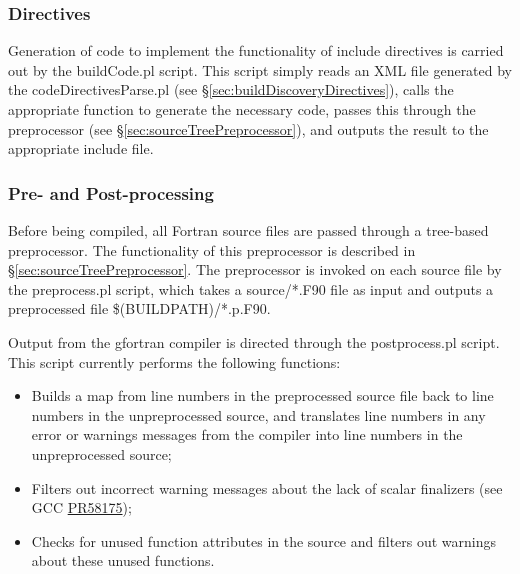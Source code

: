 \subsubsection{Directives}\label{sec:codeBuildIncludeDirectives}

Generation of code to implement the functionality of {\normalfont \ttfamily include} directives is carried out by the {\normalfont \ttfamily buildCode.pl} script. This script simply reads an XML file generated by the {\normalfont \ttfamily codeDirectivesParse.pl} (see \S\ref{sec:buildDiscoveryDirectives}), calls the appropriate function to generate the necessary code, passes this through the preprocessor (see \S\ref{sec:sourceTreePreprocessor}), and outputs the result to the appropriate include file.

\subsubsection{Pre- and Post-processing}\label{sec:codeBuildPrePostProcess}

Before being compiled, all Fortran source files are passed through a tree-based preprocessor. The functionality of this preprocessor is described in \S\ref{sec:sourceTreePreprocessor}. The preprocessor is invoked on each source file by the {\normalfont \ttfamily preprocess.pl} script, which takes a {\normalfont \ttfamily source/*.F90} file as input and outputs a preprocessed file {\normalfont \ttfamily \$(BUILDPATH)/*.p.F90}.

Output from the {\normalfont \ttfamily gfortran} compiler is directed through the {\normalfont \ttfamily postprocess.pl} script. This script currently performs the following functions:
\begin{itemize}
\item Builds a map from line numbers in the preprocessed source file back to line numbers in the unpreprocessed source, and translates line numbers in any error or warnings messages from the compiler into line numbers in the unpreprocessed source;
\item Filters out incorrect warning messages about the lack of scalar finalizers (see GCC \href{https://gcc.gnu.org/bugzilla/show_bug.cgi?id=58175}{PR58175});
\item Checks for unused function attributes in the source and filters out warnings about these unused functions.
\end{itemize}

